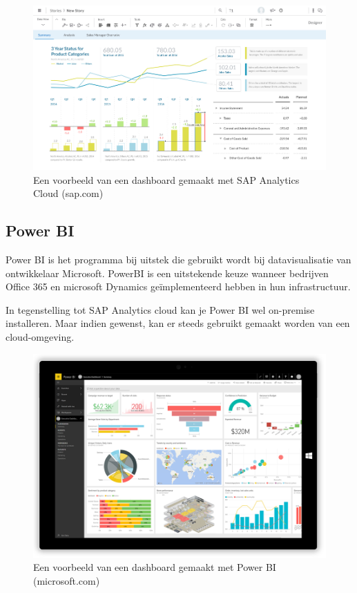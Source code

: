\begin{figure}[h]
	\centering
	\includegraphics[scale=0.45]{../images/sac.png}
	\caption{Een voorbeeld van een dashboard gemaakt met SAP Analytics Cloud (sap.com)}
	\label{fig:sac}
\end{figure}

\subsection{Power BI}
Power BI is het programma bij uitstek die gebruikt wordt bij datavisualisatie van ontwikkelaar Microsoft. PowerBI is een uitstekende keuze wanneer bedrijven Office 365 en microsoft Dynamics geïmplementeerd hebben in hun infrastructuur.

In tegenstelling tot SAP Analytics cloud kan je Power BI wel on-premise installeren. Maar indien gewenst, kan er steeds gebruikt gemaakt worden van een cloud-omgeving.

\begin{figure}[h]
	\centering
	\includegraphics[scale=0.45]{../images/powerbi.png}
	\caption{Een voorbeeld van een dashboard gemaakt met Power BI (microsoft.com)}
	\label{fig:powerbi}
\end{figure}
 





